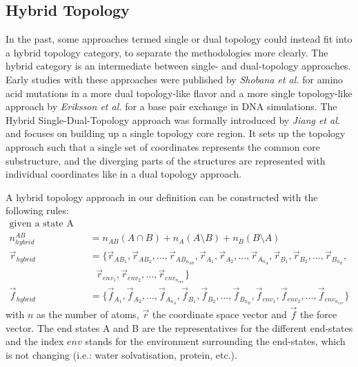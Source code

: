 \subsection{Hybrid Topology}
In the past, some approaches termed single or dual topology could instead fit into a hybrid topology category, to separate the methodologies more clearly.
The hybrid category is an intermediate between single- and dual-topology approaches. Early studies with these approaches were published by \textit{Shobana et al.} for amino acid mutations in a more dual topology-like flavor and a more single topology-like approach by \textit{Eriksson et al.} for a base pair exchange in DNA simulations.\cite{Shobana2000, Eriksson1995}
The Hybrid Single-Dual-Topology approach was formally introduced by \textit{Jiang et al.} and focuses on building up a single topology core region. \cite{Jiang2019} It sets up the topology approach such that a single set of coordinates represents the common  core substructure, and the diverging parts of the structures are represented with individual coordinates like in a dual topology approach. \cite{Jiang2019}  

A hybrid topology approach in our definition can be constructed with the following rules:
\begin{align*}
    \text{given a state A and B:}\\
    n_{hybrid}^{AB} &= n_{AB}(A \cap B) + n_A(A \setminus B) + n_B (B \setminus A)\\
    \vec{r}_{hybrid} &= \{\vec{r}_{AB_1}, \vec{r}_{AB_2}, ..., \vec{r}_{AB_{n_{AB}}}, \vec{r}_{A_1}, \vec{r}_{A_2}, ..., \vec{r}_{A_{n_{A}}}, \vec{r}_{B_1}, \vec{r}_{B_2}, ..., \vec{r}_{B_{n_{B}}},    \\ 
     &~~~\vec{r}_{env_1}, \vec{r}_{env_2}, ..., \vec{r}_{env_{n_{env}}}\}\\
    \vec{f}_{hybrid} &= \{\vec{f}_{A_1}, \vec{f}_{A_2}, ..., \vec{f}_{A_{n_{A}}},\vec{f}_{B_1}, \vec{f}_{B_2}, ..., \vec{f}_{B_{n_{B}}}, \vec{f}_{env_1}, \vec{f}_{env_2}, ..., \vec{f}_{env_{n_{env}}}\}
\end{align*}
with $n$ as the number of atoms, $\vec{r}$ the coordinate space vector and $\vec{f}$ the force vector. The end states A and B are the representatives for the different end-states and the index $env$ stands for the environment surrounding the end-states, which is not changing (i.e.: water solvatisation, protein, etc.).

